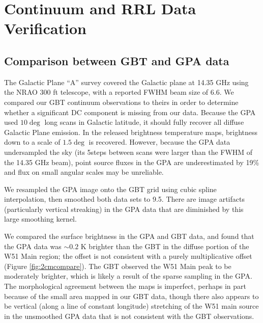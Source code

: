 \clearpage
\appendix
\section{Continuum and RRL Data Verification}
\label{sec:contrrldata}
\subsection{Comparison between GBT and GPA data}
\label{sec:gpacompare}
The Galactic Plane ``A'' survey \citep{Langston2000a} covered the Galactic
plane at 14.35 GHz using the NRAO 300 ft telescope, with a reported FWHM beam
size of 6.6\arcmin.  We compared our GBT continuum observations to theirs in
order to determine whether a significant DC component is missing from our data.
Because the GPA used $10\deg$ long scans in Galactic latitude, it should fully
recover all diffuse Galactic Plane emission.  In the released brightness temperature
maps, brightness down to a scale of $1.5\deg$ is recovered.  However, because
the GPA data undersampled the sky (its 5\arcmin steps between scans were larger
than the FWHM of the 14.35 GHz beam), point source fluxes in the GPA are
underestimated by 19\% and flux on small angular scales may be unreliable.


We resampled the GPA image onto the GBT grid using cubic spline interpolation,
then smoothed both data sets to 9.5\arcmin.  There are image artifacts
(particularly vertical streaking) in the GPA data that are diminished by this
large smoothing kernel.

We compared the surface brightness in the GPA and GBT data, and found that the
GPA data was $\sim0.2$ K brighter than the GBT in the diffuse portion of the
W51 Main region; the offset is not consistent with a purely multiplicative
offset (Figure \ref{fig:2cmcompare}).  The GBT observed the W51 Main peak to be
moderately brighter, which is likely a result of the sparse sampling in the
GPA.  The morphological agreement between the maps is imperfect, perhaps in
part because of the small area mapped in our GBT data, though there also
appears to be vertical (along a line of constant longitude) stretching of the
W51 main source in the unsmoothed GPA data that is not consistent with the GBT
observations.

